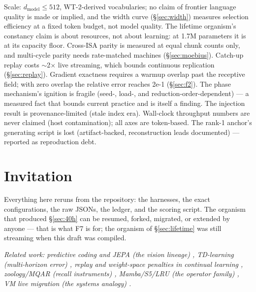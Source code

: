 \documentclass[11pt]{article}
\theoremstyle{definition}
\begin{document}
Scale: $d_\text{model} \le 512$, WT-2-derived vocabularies; no claim of
frontier language quality is made or implied, and the width curve
(\S\ref{sec:width}) measures selection efficiency at a fixed token budget,
not model quality. The lifetime organism's constancy claim is about
resources, not about learning: at 1.7M parameters it is at its capacity
floor. Cross-ISA parity is measured at equal chunk counts only, and
multi-cycle parity needs rate-matched machines (\S\ref{sec:moebius}).
Catch-up replay costs $\sim$2$\times$ live streaming, which bounds
continuous replication (\S\ref{sec:replay}). Gradient exactness requires a
warmup overlap past the receptive field; with zero overlap the relative
error reaches 2e-1 (\S\ref{sec:f2}). The phase mechanism's ignition is
fragile (seed-, load-, and reduction-order-dependent) --- a measured fact
that bounds current practice and is itself a finding. The injection result
is provenance-limited (stale index era). Wall-clock throughput numbers are
never claimed (host contamination); all axes are token-based. The rank-1
anchor's generating script is lost (artifact-backed, reconstruction leads
documented) --- reported as reproduction debt.

\section{Invitation}

Everything here reruns from the repository: the harnesses, the exact
configurations, the raw JSONs, the ledger, and the scoring script. The
organism that produced \S\ref{sec:40h} can be resumed, forked, migrated, or
extended by anyone --- that is what F7 is for; the organism of
\S\ref{sec:lifetime} was still streaming when this draft was compiled.

\bigskip
\noindent\textit{Related work: predictive coding and JEPA (the vision
lineage) \cite{rao1999predictive,lecun2022path}, TD-learning (multi-horizon
error) \cite{sutton1988td}, replay and weight-space penalties in continual
learning \cite{vandeven2019replay,kirkpatrick2017ewc}, zoology/MQAR (recall
instruments) \cite{arora2024zoology}, Mamba/S5/LRU (the operator family)
\cite{gu2023mamba,smith2023s5,orvieto2023lru}, VM live migration (the
systems analogy) \cite{clark2005livemigration}.}

{\small


}
\end{document}
